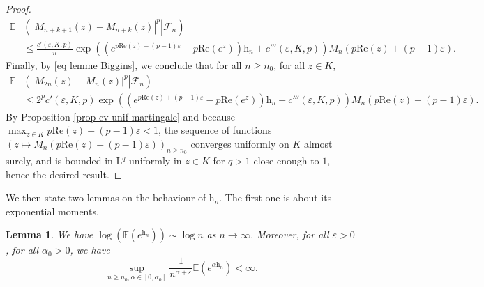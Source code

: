 \documentclass[11pt]{article}
\newtheorem{lemma}[theorem]{Lemma}
\numberwithin{equation}{section}
\def\vp{\varepsilon}
\def\E{\mathbb{E}}
\renewcommand{\Re}{\mathrm{Re}}
\begin{document}
\begin{proof}
	\begin{align*}
		\E&\left( \left. \left\vert M_{n+k+1}(z)-M_{n+k}(z) \right\vert^p  \right\vert \mathcal{F}_{n}\right)\\&\le 
		\frac{c'(\vp, K, p)}{n} \exp\left( \left(e^{p \Re(z) +(p-1)\vp}-p\Re(e^z)\right) \mathrm{h}_n +c'''(\vp, K, p)\right)
		M_{n}(p\Re(z)+(p-1)\vp).
	\end{align*}
	Finally, by \eqref{eq lemme Biggins}, we conclude that for all $n\ge n_0$, for all $z \in K$,
	\begin{align*}
		\E&\left( \left. \left\vert M_{2n}(z)-M_{n}(z) \right\vert^p  \right\vert \mathcal{F}_{n}\right)\\&\le 
		{2^p c'(\vp, K, p)} \exp\left( \left(e^{p \Re(z) +(p-1)\vp}-p\Re(e^z)\right) \mathrm{h}_n +c'''(\vp, K, p)\right)
		M_{n}(p\Re(z)+(p-1)\vp).
	\end{align*}
	By Proposition \ref{prop cv unif martingale} and because $\max_{z \in K} p \Re(z) + (p-1)\vp <1$, the sequence of functions $(z\mapsto M_{n}(p\Re(z)+(p-1)\vp))_{n\ge n_0}$ converges uniformly on $K$ almost surely, and is bounded in $\mathrm{L}^q$ uniformly in $z \in K$ for $q>1$ close enough to $1$, hence the desired result.
\end{proof}
We then state two lemmas on the behaviour of $\mathrm{h}_n$. The first one is about its exponential moments.
\begin{lemma}\label{lemme moment exponentiel h n}
	We have $\log (\E(e^{\mathrm{h}_n})) \sim \log n$ as $n\to \infty$. Moreover, for all $\vp>0$, for all $\alpha_0>0$, we have
	\[
	\sup_{n\ge n_0, \alpha \in [0, \alpha_0]} \frac{1}{n^{\alpha+\vp}} \E\left(e^{\alpha \mathrm{h}_n}\right) <\infty.
	\]
\end{lemma}
\end{document}
